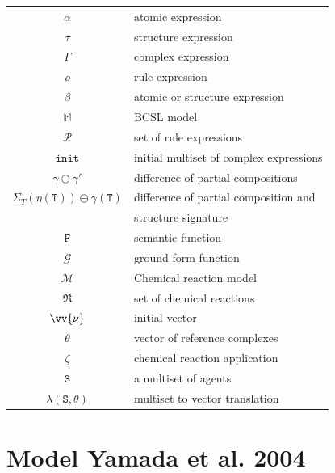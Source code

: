 \documentclass[12pt, twoside]{fithesis2} %
\begin{document}
\begin{appendices}
\begin{center}
\begin{tabular}{c | l}
$\alpha$ & atomic expression\\
$\tau$ & structure expression\\
$\Gamma$ & complex expression\\
$\varrho$ & rule expression\\
$\beta$ & atomic or structure expression\\
\hline 
$\mathds{M}$ & BCSL model\\
$\mathcal{R}$ & set of rule expressions\\
$\mathtt{init}$ & initial multiset of complex expressions\\
\hline 
$\gamma \ominus \gamma'$ & difference of partial compositions\\
$\Sigma_T(\mathtt{\eta(\mathtt{T})}) \ominus \gamma(\mathtt{T})$ & difference of partial composition and\\
 & structure signature\\
 \hline 
$\mathtt{F}$ & semantic function\\
$\mathcal{G}$ & ground form function\\
\hline 
$\mathcal{M}$ & Chemical reaction model\\
$\mathfrak{R}$ & set of chemical reactions\\
$\vv{\nu}$ & initial vector\\
$\theta$ & vector of reference complexes\\
\hline 
$\zeta$ & chemical reaction application\\
$\mathtt{S}$ & a multiset of agents\\
$\lambda(\mathtt{S}, \theta)$ & multiset to vector translation\\
\end{tabular}
\end{center}

\chapter{Model Yamada et al. 2004}
\label{yamada_complete}


\end{appendices}
\end{document}
